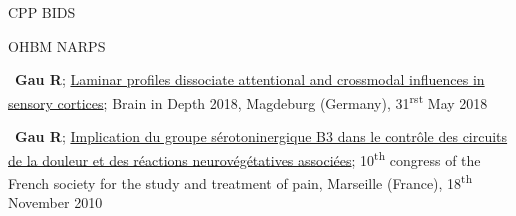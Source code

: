 CPP BIDS

OHBM NARPS

\textbullet~\textbf{Gau R}; 
\href{https://figshare.com/s/06d360f8ec1be9431f6e}{Laminar profiles dissociate attentional and crossmodal influences in sensory cortices}; 
Brain in Depth 2018, 
Magdeburg (Germany), 
31\textsuperscript{rst} May 2018

\textbullet~\textbf{Gau R}; 
\href{http://www.researchgate.net/profile/Remi_Gau/publication/312084405_Implication_du_groupe_serotoninergique_B3_dans_le_controle_des_circuits_de_la_douleur_et_des_reactions_neurovegetatives_associees/links/586e5f4a08ae6eb871bcfcc2?origin=publication_detail&ev=pub_int_prw_xdl&msrp=fq7qspniFbcYB53CbrroAtz2DNXxUJar7CmckJaw6O2YzI7LWasFAW99t9G74Z5sL-KLoJT2Dqv8D075R3ghy55Fy6xPne3_ARZvM87O3Ao.5ii75N_9y4vKCns-VUuTTDNhKb6ruhYALqaObgtdOB4WIkUSArh9tdzN9AtPRWz68YGcjTb3scxfWZy6tYxnSg.naSDUCbUZHM6gF6BaFbjpF3ARcyIPTBh1UsuA1cVoOZQsoPMn9YGNC2UsgdGA0P28xoO8bXY1221-tRVtfrUZA}{Implication du groupe sérotoninergique B3 dans le contrôle des circuits de la douleur et des réactions neurovégétatives associées}; 
10\textsuperscript{th} congress of the French society for the study and treatment of pain, 
Marseille (France), 
18\textsuperscript{th} November 2010
